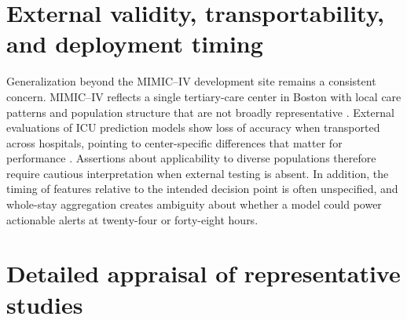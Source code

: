 \section{External validity, transportability, and deployment timing}
Generalization beyond the MIMIC--IV development site remains a consistent concern. MIMIC--IV reflects a single tertiary-care center in Boston with local care patterns and population structure that are not broadly representative \citep{Johnson_2023_MIMIC}. External evaluations of ICU prediction models show loss of accuracy when transported across hospitals, pointing to center-specific differences that matter for performance \citep{Rockenschaub_2024}. Assertions about applicability to diverse populations therefore require cautious interpretation when external testing is absent. In addition, the timing of features relative to the intended decision point is often unspecified, and whole-stay aggregation creates ambiguity about whether a model could power actionable alerts at twenty-four or forty-eight hours.

\section{Detailed appraisal of representative studies}

